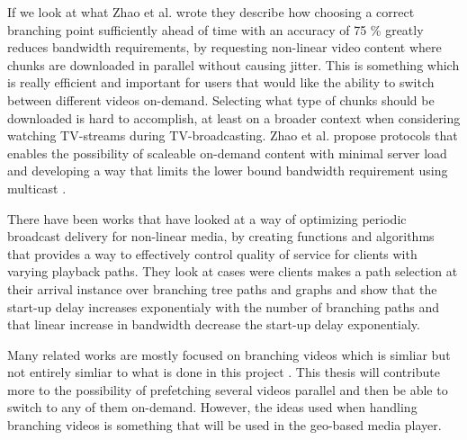 If we look at what Zhao et al. \cite{scalableOnDemand} wrote they describe how choosing a correct branching point sufficiently ahead of time with an accuracy of 75 \% greatly reduces bandwidth requirements, by requesting non-linear video content where chunks are downloaded in parallel without causing jitter. This is something which is really efficient and important for users that would like the ability to switch between different videos on-demand. Selecting what type of chunks should be downloaded is hard to accomplish, at least on a broader context when considering watching TV-streams during TV-broadcasting. Zhao et al. \cite{scalableOnDemand} propose protocols that enables the possibility of scaleable on-demand content with minimal server load and developing a way that limits the lower bound bandwidth requirement using multicast \cite{scalableOnDemand}. 


There have been works that have looked at a way of optimizing periodic broadcast delivery for non-linear media, by creating functions and algorithms that provides a way to effectively control quality of service for clients with varying playback paths. They look at cases were clients makes a path selection at their arrival instance over branching tree paths and graphs and show that the start-up delay increases exponentialy with the number of branching paths and that linear increase in bandwidth decrease the start-up delay exponentialy\cite{optimizedbroadcast}.

Many related works are mostly focused on branching videos which is simliar but not entirely simliar to what is done in this project \cite{qualbranch, hasmultipath,scalableOnDemand}. This thesis will contribute more to the possibility of prefetching several videos parallel and then be able to switch to any of them on-demand. However, the ideas used when handling branching videos is something that will be used in the geo-based media player.

